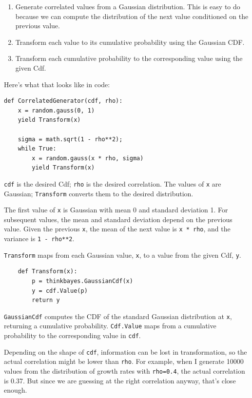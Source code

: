 \documentclass[12pt]{book}
\begin{document}
\begin{enumerate}

\item Generate correlated values from a Gaussian distribution.
  This is easy to do because we can compute the distribution
  of the next value conditioned on the previous value.

\item Transform each value to its cumulative probability using
  the Gaussian CDF.

\item Transform each cumulative probability to the corresponding value
  using the given Cdf.

\end{enumerate}

Here's what that looks like in code:

\begin{verbatim}
def CorrelatedGenerator(cdf, rho):
    x = random.gauss(0, 1)
    yield Transform(x)

    sigma = math.sqrt(1 - rho**2);    
    while True:
        x = random.gauss(x * rho, sigma)
        yield Transform(x)
\end{verbatim}

{\tt cdf} is the desired Cdf; {\tt rho} is the desired correlation.
The values of {\tt x} are Gaussian; {\tt Transform} converts them
to the desired distribution.

The first value of {\tt x} is Gaussian with mean 0 and standard
deviation 1.  For subsequent values, the mean and standard deviation
depend on the previous value.  Given the previous {\tt x}, the mean of the
next value is {\tt x * rho}, and the variance is {\tt 1 - rho**2}.

{\tt Transform} maps from each
Gaussian value, {\tt x}, to a value from the given Cdf, {\tt y}.

\begin{verbatim}
    def Transform(x):
        p = thinkbayes.GaussianCdf(x)
        y = cdf.Value(p)
        return y
\end{verbatim}

{\tt GaussianCdf} computes the CDF of the standard Gaussian
distribution at {\tt x}, returning a cumulative probability.
{\tt Cdf.Value} maps from a cumulative probability to the
corresponding value in {\tt cdf}.

Depending on the shape of {\tt cdf}, information can
be lost in transformation, so the actual correlation might be
lower than {\tt rho}.  For example, when I generate
10000 values from the distribution of growth rates with
{\tt rho=0.4}, the actual correlation is 0.37.
But since we are guessing at the right correlation anyway,
that's close enough.
\end{document}

